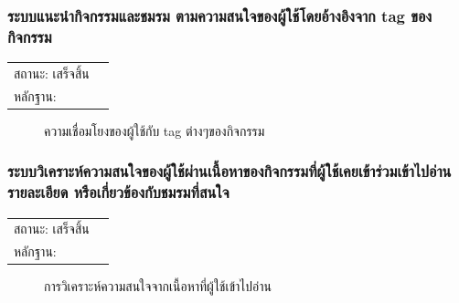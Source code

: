 \documentclass[14pt,oneside,openright,a4paper]{cpe-thai-project}
\begin{document}
\subsubsection{ระบบแนะนํากิจกรรมและชมรม ตามความสนใจของผู้ใช้โดยอ้างอิงจาก tag ของกิจกรรม}
\begin{tabular}{@{}p{2cm}p{10cm}@{}}
  สถานะ: เสร็จสิ้น \\
  หลักฐาน: & \\
\end{tabular}
\begin{figure}[!h]\centering
  \setlength{\fboxrule}{0.5mm} %
  \setlength{\fboxsep}{0.5cm}
  \caption{ความเชื่อมโยงของผู้ใช้กับ tag ต่างๆของกิจกรรม}\label{fig:sinfo}
\end{figure}

\newpage

\subsubsection{ระบบวิเคราะห์ความสนใจของผู้ใช้ผ่านเนื้อหาของกิจกรรมที่ผู้ใช้เคยเข้าร่วมเข้าไปอ่านรายละเอียด หรือเกี่ยวข้องกับชมรมที่สนใจ}
\begin{tabular}{@{}p{2cm}p{10cm}@{}}
  สถานะ: เสร็จสิ้น \\
  หลักฐาน: & \\
\end{tabular}
\begin{figure}[!h]\centering
  \setlength{\fboxrule}{0.5mm} %
  \setlength{\fboxsep}{0.5cm}
  \caption{การวิเคราะห์ความสนใจจากเนื้อหาที่ผู้ใช้เข้าไปอ่าน}\label{fig:sinfo}
\end{figure}
\end{document}
